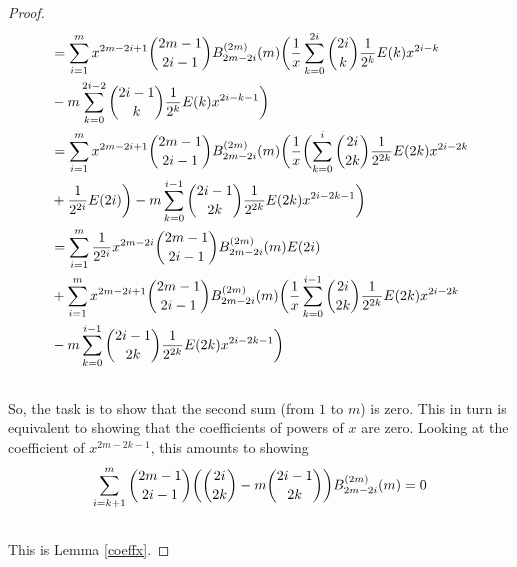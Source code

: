 \documentclass[fleqn,a4paper,9pt]{article}
\begin{document}
\begin{flushleft}
\begin{proof}
\begin{align}
&=\sum_{i=1}^{m}x^{2m-2i+1}\binom{2m-1}{2i-1}B_{2m-2i}^{(2m)}(m) \biggl(\frac{1}{x}\sum_{k=0}^{2i}\binom{2i}{k}\frac{1}{2^k}E(k)x^{2i-k}\\\notag
&-m \sum_{k=0}^{2i-2}\binom{2i-1}{k}\frac{1}{2^k}E(k)x^{2i-k-1}\biggr)\\\notag
&=\sum_{i=1}^{m}x^{2m-2i+1}\binom{2m-1}{2i-1}B_{2m-2i}^{(2m)}(m) \biggl(\frac{1}{x}\biggl(\sum_{k=0}^{i}\binom{2i}{2k}\frac{1}{2^{2k}}E(2k)x^{2i-2k}\\\notag
&+\frac{1}{2^{2i}}E(2i)\biggr)-m \sum_{k=0}^{i-1}\binom{2i-1}{2k}\frac{1}{2^{2k}}E(2k)x^{2i-2k-1}\biggr)\\\notag
&=\sum_{i=1}^{m}\frac{1}{2^{2i}}x^{2m-2i}\binom{2m-1}{2i-1}B_{2m-2i}^{(2m)}(m)E(2i)\\\notag
&+\sum_{i=1}^{m}x^{2m-2i+1}\binom{2m-1}{2i-1}B_{2m-2i}^{(2m)}(m) \biggl(\frac{1}{x}\sum_{k=0}^{i-1}\binom{2i}{2k}\frac{1}{2^{2k}}E(2k)x^{2i-2k}\\\notag
&-m \sum_{k=0}^{i-1}\binom{2i-1}{2k}\frac{1}{2^{2k}}E(2k)x^{2i-2k-1}\biggr)\\\notag
\end{align}
So, the task is to show that the second sum (from $1$ to $m$) is zero. This in turn is equivalent to showing that the coefficients of powers of $x$ are zero. Looking at the coefficient of $x^{2m-2k-1}$, this amounts to showing
\begin{align}
\sum_{i=k+1}^m \binom{2m-1}{2i-1}\biggl(\binom{2i}{2k}-m\binom{2i-1}{2k}\biggr)B_{2m-2i}^{(2m)}(m)=0\\\notag
\end{align}
This is Lemma \ref{coeffx}.
\end{proof}


\end{flushleft}
\end{document}

